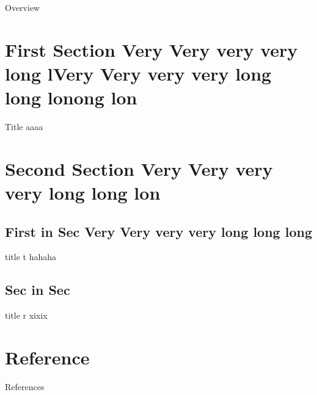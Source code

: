 \documentclass[compress]{beamer}
\title{}
\author{}
\begin{document}
\begin{frame}
    \titlepage{}
\end{frame}

\begin{frame}{Overview}
\tableofcontents
\end{frame}

\section{First Section Very Very very very long lVery Very very very long long lonong lon}

\begin{frame}{Title}
    aaaa \autocite{kolbIntroductionBrainBehavior2019}
\end{frame}

\section{Second Section Very Very very very long long lon}

\subsection{First in Sec Very Very very very long long long}

\begin{frame}{title t}
    hahaha
\end{frame}


\subsection{Sec in Sec}

\begin{frame}{title r}
    xixix
\end{frame}


\section{Reference}
\begin{frame}{References}
    \footnotesize{
        \printbibliography{}
    }
\end{frame}
\end{document}
